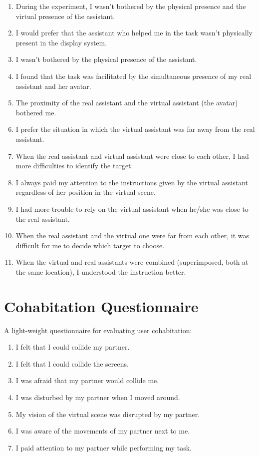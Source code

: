 \begin{appendices}
\begin{enumerate}
	\item During the experiment, I wasn't bothered by the physical presence and the virtual presence of the assistant.
	\item I would prefer that the assistant who helped me in the task wasn't physically present in the display system.
	\item I wasn't bothered by the physical presence of the assistant.
	\item I found that the task was facilitated by the simultaneous presence of my real assistant and her avatar.
	\item The proximity of the real assistant and the virtual assistant (the avatar) bothered me.
	\item I prefer the situation in which the virtual assistant was far away from the real assistant.
	\item When the real assistant and virtual assistant were close to each other, I had more difficulties to identify the target.
	\item I always paid my attention to the instructions given by the virtual assistant regardless of her position in the virtual scene.
	\item I had more trouble to rely on the virtual assistant when he/she was close to the real assistant.
	\item When the real assistant and the virtual one were far from each other, it was difficult for me to decide which target to choose.
	\item When the virtual and real assistants were combined (superimposed, both at the same location), I understood the instruction better.
\end{enumerate}

\chapter{Cohabitation Questionnaire}
\label{appendix:cohab_q}
A light-weight questionnaire for evaluating user cohabitation:
\begin{enumerate}
	\item I felt that I could collide my partner.
	\item I felt that I could collide the screens.
	\item I was afraid that my partner would collide me.
	\item I was disturbed by my partner when I moved around.
	\item My vision of the virtual scene was disrupted by my partner.
	\item I was aware of the movements of my partner next to me.
	\item I paid attention to my partner while performing my task.
\end{enumerate}


\end{appendices}
